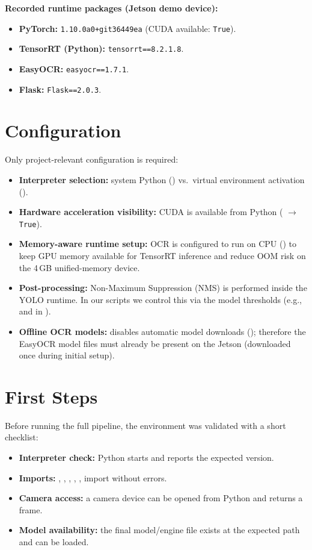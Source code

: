 \vspace{1mm}
\noindent
\textbf{Recorded runtime packages (Jetson demo device):}
\begin{itemize}
	\item \textbf{PyTorch:} \texttt{1.10.0a0+git36449ea} (CUDA available: \texttt{True}).
	\item \textbf{TensorRT (Python):} \texttt{tensorrt==8.2.1.8}.
	\item \textbf{EasyOCR:} \texttt{easyocr==1.7.1}.
	\item \textbf{Flask:} \texttt{Flask==2.0.3}.
\end{itemize}

\section{Configuration}
\noindent
Only project-relevant configuration is required:
\begin{itemize}
		\item \textbf{Interpreter selection:} system Python () vs.\ virtual environment activation ().
		\item \textbf{Hardware acceleration visibility:} CUDA is available from Python ( $\rightarrow$ \texttt{True}).
		\item \textbf{Memory-aware runtime setup:} OCR is configured to run on CPU () to keep GPU memory available for TensorRT inference and reduce OOM risk on the 4\,GB unified-memory device.
		\item \textbf{Post-processing:} Non-Maximum Suppression (NMS) is performed inside the YOLO runtime. In our scripts we control this via the model thresholds (e.g.,  and  in ).
		\item \textbf{Offline OCR models:}  disables automatic model downloads (); therefore the EasyOCR model files must already be present on the Jetson (downloaded once during initial setup).
\end{itemize}

\section{First Steps}
\noindent
Before running the full pipeline, the environment was validated with a short checklist:
\begin{itemize}
	\item \textbf{Interpreter check:} Python starts and reports the expected version.
	\item \textbf{Imports:} , , , , ,  import without errors.
	\item \textbf{Camera access:} a camera device can be opened from Python and returns a frame.
	\item \textbf{Model availability:} the final model/engine file exists at the expected path and can be loaded.
\end{itemize}

